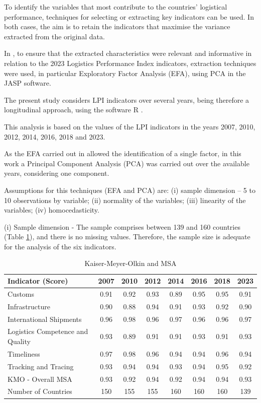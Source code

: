 \documentclass[conference]{IEEEtran}
\begin{document}
To identify the variables that most contribute  to the countries' logistical performance, techniques for selecting or extracting key indicators can be used. In both cases, the aim is to retain the indicators that maximise the variance extracted from the original data.

In \cite{correiaICIE}, to ensure that the extracted characteristics were relevant and informative in relation to the 2023 Logistics Performance Index indicators, extraction techniques were used, in particular Exploratory Factor Analysis (EFA), using PCA in the JASP \cite{JASP} software.

The present study considers LPI indicators over several years, being therefore a longitudinal approach, using the software R \cite{R}.

This analysis is based on the values of the LPI \cite{lpi_worldbank_2023} indicators in the years 2007, 2010, 2012, 2014, 2016, 2018 and 2023.

As the EFA carried out in \cite{correiaICIE} allowed the identification of a single factor, in this work a Principal Component Analysis (PCA) was carried out over the available years, considering one component.

Assumptions for this techniques (EFA and PCA)  are: (i) sample dimension -- 5 to 10 observations by variable; (ii) normality of the variables; (iii) linearity of the variables; (iv) homocedasticity.

(i) Sample dimension - The sample comprises between 139 and 160 countries (Table \ref{tab:kmo}), and there is no missing values. Therefore, the sample size is adequate for the analysis of the six indicators.

\begin{table}[h]
  \caption{Kaiser-Meyer-Olkin and MSA}
  \label{tab:kmo}
  \centering
\begin{tabular}{lccccccc}
\hline
\textbf{Indicator (Score)}	&	\textbf{2007}	&	\textbf{2010}	&	\textbf{2012}	&	\textbf{2014}	&	\textbf{2016}	&	\textbf{2018}	&	\textbf{2023}	\\  
\hline
Customs	&	0.91	&	0.92	&	0.93	&	0.89	&	0.95	&	0.95	&	0.91	\\	
Infrastructure	&	0.90	&	0.88	&	0.94	&	0.91	&	0.93	&	0.92	&	0.90	\\	 
International Shipments	&	0.96	&	0.98	&	0.96	&	0.97	&	0.96	&	0.96	&	0.97	\\	 
Logistics Competence and Quality	&	0.93	&	0.89	&	0.91	&	0.91	&	0.93	&	0.91	&	0.93	\\	 
Timeliness	&	0.97	&	0.98	&	0.96	&	0.94	&	0.94	&	0.96	&	0.94	\\	 
Tracking and Tracing	&	0.93	&	0.94	&	0.94	&	0.93	&	0.94	&	0.95	&	0.92	\\	 
\hline
KMO - Overall MSA	&	0.93	&	0.92	&	0.94	&	0.92	&	0.94	&	0.94	&	0.93	\\	 
\hline
Number of Countries	&	150	&	155	&	155	&	160	&	160	&	160	&	139\\	
\hline
\end{tabular}
\end{table}
\end{document}
